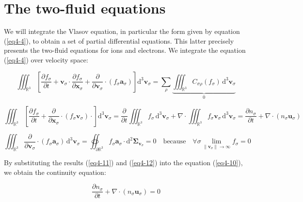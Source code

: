 \section{The two-fluid equations}

We will integrate the Vlasov equation, in particular the form given by equation (\ref{eq4-4}), to obtain a set of partial differential equations. This latter precisely presents the two-fluid equations for ions and electrons. We integrate the equation (\ref{eq4-4}) over velocity space:

\begin{equation}
    \label{eq4-10}
    \iiint_{\mathbb{R}^3}\left[\frac{\partial f_\sigma}{\partial t}+\mathbf{v}_\sigma\cdot\frac{\partial f_\sigma}{\partial\mathbf{x}_\sigma}+\frac{\partial}{\partial\mathbf{v}_\sigma}\cdot\left(f_\sigma\mathbf{a}_\sigma\right)\right]\mathrm{d}^3\mathbf{v}_\sigma=\sum_{\rho}\underbrace{\iiint_{\mathbb{R}^3}C_{\sigma\rho}(f_\sigma)\,\mathrm{d}^3\mathbf{v}_\sigma}_0
\end{equation}

\vspace*{-0.5cm}

\begin{equation}
    \label{eq4-11}
    \iiint_{\mathbb{R}^3}\left[\frac{\partial f_\sigma}{\partial t}+\frac{\partial}{\partial\mathbf{x}_\sigma}\cdot(f_\sigma\mathbf{v}_\sigma)\cdot\right]\mathrm{d}^3\mathbf{v}_\sigma=\frac{\partial}{\partial t}\iiint_{\mathbb{R}^3}f_\sigma\,\mathrm{d}^3\mathbf{v}_\sigma+\nabla\cdot\iiint_{\mathbb{R}^3}f_\sigma\mathbf{v}_\sigma\,\mathrm{d}^3\mathbf{v}_\sigma=\frac{\partial n_\sigma}{\partial t}+\nabla\cdot(n_\sigma\mathbf{u}_\sigma)
\end{equation}

\begin{equation}
    \label{eq4-12}
    \iiint_{\mathbb{R}^3}\frac{\partial}{\partial\mathbf{v}_\sigma}\cdot(f_\sigma\mathbf{a}_\sigma)\,\mathrm{d}^3\mathbf{v}_\sigma=\oiint_{\partial\mathbb{R}^3} f_\sigma\mathbf{a}_\sigma\cdot\mathrm{d}^2\boldsymbol{\Sigma}_{\mathbf{v}_\sigma}=0\quad\text{because}\quad\forall\sigma\lim_{\|\mathbf{v}_\sigma\|\to\infty}f_\sigma=0
\end{equation}

By substituting the results (\ref{eq4-11}) and (\ref{eq4-12}) into the equation (\ref{eq4-10}), we obtain the continuity equation:

\begin{equation}
    \label{eq4-13}
    \frac{\partial n_\sigma}{\partial t}+\nabla\cdot(n_\sigma\mathbf{u}_\sigma)=0
\end{equation}

